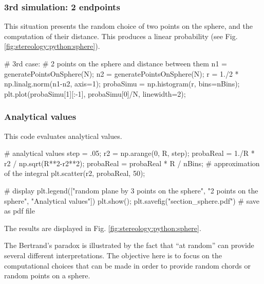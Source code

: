 \subsubsection{3rd simulation: 2 endpoints}
This situation presents the random choice of two points on the sphere, and the computation of their distance. This produces a linear probability (see Fig.\ref{fig:stereology:python:sphere}).
\begin{python}
# 3rd case: 
# 2 points on the sphere and distance between them
n1 = generatePointsOnSphere(N);
n2 = generatePointsOnSphere(N);
r = 1./2 * np.linalg.norm(n1-n2, axis=1);
probaSimu = np.histogram(r, bins=nBins);
plt.plot(probaSimu[1][:-1], probaSimu[0]/N, linewidth=2);
\end{python}

\subsubsection{Analytical values}
This code evaluates analytical values.

\begin{python}
# analytical values
step = .05;
r2 = np.arange(0, R, step);
probaReal = 1./R * r2 / np.sqrt(R**2-r2**2);
probaReal = probaReal * R / nBins; # approximation of the integral
plt.scatter(r2, probaReal, 50);

# display
plt.legend(["random plane by 3 points on the sphere", "2 points on the sphere", "Analytical values"])
plt.show();
plt.savefig("section_sphere.pdf") # save as pdf file
\end{python}

The results are displayed in Fig. \ref{fig:stereology:python:sphere}.

\begin{note}The Bertrand's paradox is illustrated by the fact that ``at random'' can provide several different interpretations. 
The objective here is to focus on the computational choices that can be made in order to provide random chords or random points on a sphere.\end{note}
